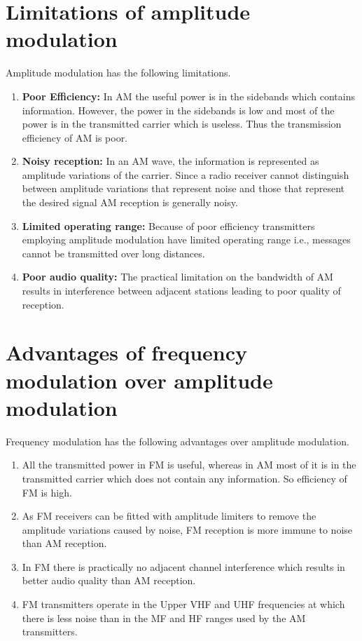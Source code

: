 \section{Limitations of amplitude modulation}\label{sec9.20}

Amplitude modulation has the following limitations.
\begin{enumerate}
\item {\bf Poor Efficiency:} In AM the useful power is in the sidebands which contains information. However, the power in the sidebands is low and most of the power is in the transmitted carrier which is useless. Thus the transmission efficiency of AM is poor.

\item {\bf Noisy reception:} In an AM wave, the information is represented as amplitude variations of the carrier. Since a radio receiver cannot distinguish between amplitude variations that represent noise and those that represent the desired signal AM reception is generally noisy.

\item {\bf Limited operating range:} Because of poor efficiency transmitters employing amplitude modulation have limited operating range i.e., messages cannot be transmitted over long distances.

\item {\bf Poor audio quality:} The practical limitation on the bandwidth of AM results in interference between adjacent stations leading to poor quality of reception.
\end{enumerate}

\section{Advantages of frequency modulation over amplitude modulation}\label{sec9.21}

Frequency modulation has the following advantages over amplitude modulation.
\begin{enumerate}
\item All the transmitted power in FM is useful, whereas in AM most of it is in the transmitted carrier which does not contain any information. So efficiency of FM is high.

\item As FM receivers can be fitted with amplitude limiters to remove the amplitude variations caused by noise, FM reception is more immune to noise than AM reception.

\item In FM there is practically no adjacent channel interference which results in better audio quality than AM reception.

\item FM transmitters operate in the Upper VHF and UHF frequencies at which there is less noise than in the MF and HF ranges used by the AM transmitters.
\end{enumerate}

